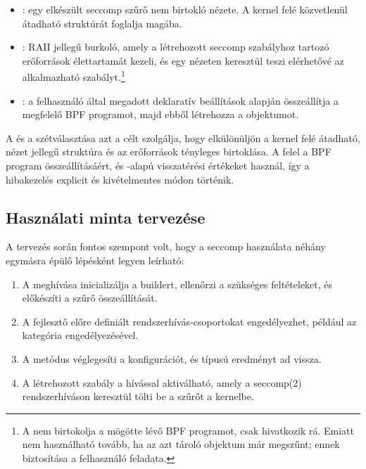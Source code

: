\begin{itemize}
  \item {}: egy elkészült seccomp szűrő nem birtokló
  nézete. A kernel felé közvetlenül átadható  struktúrát
  foglalja magába.

  \item {}: RAII jellegű burkoló, amely a létrehozott
  seccomp szabályhoz tartozó erőforrások élettartamát kezeli, és egy
   nézeten keresztül teszi elérhetővé az alkalmazható
  szabályt.\footnote{A  nem birtokolja a mögötte lévő
  BPF programot, csak hivatkozik rá. Emiatt nem használható tovább, ha az azt
  tároló  objektum már megszűnt; ennek biztosítása a
  felhasználó feladata.}

  \item {}: a felhasználó által megadott deklaratív
  beállítások alapján összeállítja a megfelelő BPF programot, majd ebből
  létrehozza a  objektumot.
\end{itemize}

A  és a  szétválasztása azt a célt
szolgálja, hogy elkülönüljön a kernel felé átadható, nézet jellegű struktúra és
az erőforrások tényleges birtoklása. A  felel a BPF
program összeállításáért, és -alapú visszatérési értékeket
használ, így a hibakezelés explicit és kivételmentes módon történik.

\subsection{Használati minta tervezése}

A tervezés során fontos szempont volt, hogy a seccomp használata néhány
egymásra épülő lépésként legyen leírható:

\begin{enumerate}
  \item A  meghívása inicializálja a buildert,
  ellenőrzi a szükséges feltételeket, és előkészíti a szűrő összeállítását.

  \item A fejlesztő előre definiált rendszerhívás-csoportokat engedélyezhet, például
  az  kategória engedélyezésével.

  \item A  metódus véglegesíti a konfigurációt, és
   típusú
  eredményt ad vissza.

  \item A létrehozott szabály a  hívással aktiválható,
  amely a seccomp(2) rendszerhíváson keresztül tölti be a szűrőt a
  kernelbe.
\end{enumerate}

